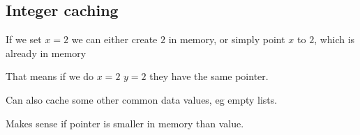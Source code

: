 
\subsection{Integer caching}

If we set \(x=2\)  we can either create \(2\) in memory, or simply point \(x\) to \(2\), which is already in memory

That means if we do \(x=2\) \(y=2\) they have the same pointer.

Can also cache some other common data values, eg empty lists.

Makes sense if pointer is smaller in memory than value.

